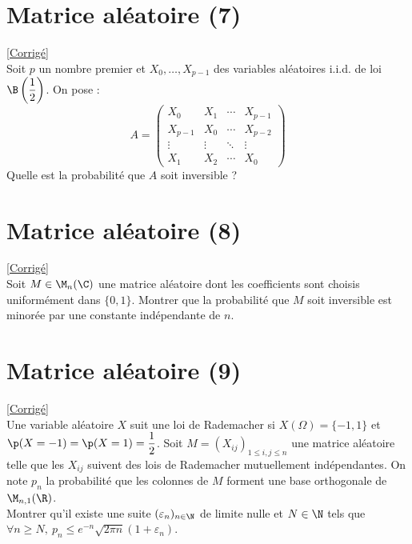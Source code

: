\documentclass[8pt]{book}
\begin{document}
\section{Matrice aléatoire (7)}
\label{Matrice aléatoire 7}
\textcolor{blue}{\hyperref[Matrice aléatoire 7 corrigé]{[Corrigé]}}\\
Soit $p$ un nombre premier et $X_0,\dots,X_{p-1}$ des variables aléatoires i.i.d. de loi $\B\left(\displaystyle\frac{1}{2}\right)$. On pose :
$$A=\begin{pmatrix}
	X_0&X_1&\cdots&X_{p-1}\\
	X_{p-1}&X_0&\cdots&X_{p-2}\\
	\vdots&\vdots&\ddots&\vdots\\
	X_1&X_2&\cdots&X_0
\end{pmatrix}$$
Quelle est la probabilité que $A$ soit inversible ?

\section{Matrice aléatoire (8)}
\label{Matrice aléatoire 8}
\textcolor{blue}{\hyperref[Matrice aléatoire 8 corrigé]{[Corrigé]}}\\
Soit $M\in \M_n(\C)$ une matrice aléatoire dont les coefficients sont choisis uniformément dans $\{0,1\}$. Montrer que la probabilité que $M$ soit inversible est minorée par une constante indépendante de $n$.

\section{Matrice aléatoire (9)}
\label{Matrice aléatoire (9)}
\textcolor{blue}{\hyperref[Matrice aléatoire (9) corrigé]{[Corrigé]}}\\
Une variable aléatoire $X$ suit une loi de Rademacher si $X(\Omega)=\{-1,1\}$ et $\p(X=-1)=\p(X=1)=\displaystyle\frac{1}{2}$. Soit $M=(X_{ij})_{1\leq i,j\leq n}$ une matrice aléatoire telle que les $X_{ij}$ suivent des lois de Rademacher mutuellement indépendantes. On note $p_n$ la probabilité que les colonnes de $M$ forment une base orthogonale de $\M_{n,1}(\R)$.\\
Montrer qu'il existe une suite $(\varepsilon_n)_{n\in \N}$ de limite nulle et $N\in \N$ tels que $\forall n\geq N,\ p_n\leq e^{-n}\sqrt{2\pi n}(1+\varepsilon_n)$.
\end{document}
